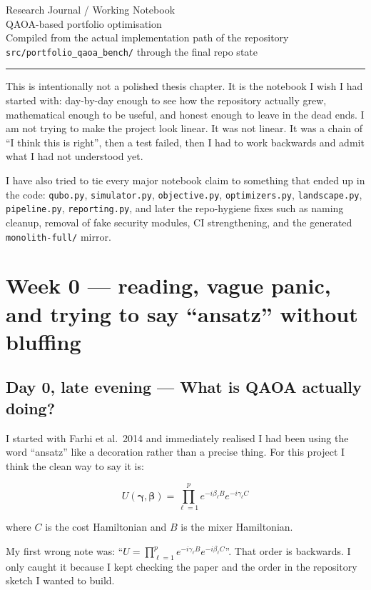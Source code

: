 \documentclass[11pt]{article}
\newcommand{\entry}[2]{\subsection*{#1 --- #2}}
\newcommand{\repo}[1]{\texttt{#1}}
\begin{document}
\begin{center}
{\LARGE Research Journal / Working Notebook}\\[0.4em]
{\large QAOA-based portfolio optimisation}\\[0.6em]
{\normalsize Compiled from the actual implementation path of the repository}\\
{\normalsize \repo{src/portfolio\_qaoa\_bench/} through the final repo state}
\end{center}

\hrule
\vspace{0.8em}

This is intentionally not a polished thesis chapter. It is the notebook I wish I had started with:
day-by-day enough to see how the repository actually grew, mathematical enough to be useful,
and honest enough to leave in the dead ends. I am not trying to make the project look linear.
It was not linear. It was a chain of ``I think this is right'', then a test failed, then I had
to work backwards and admit what I had not understood yet.

I have also tried to tie every major notebook claim to something that ended up in the code:
\repo{qubo.py}, \repo{simulator.py}, \repo{objective.py}, \repo{optimizers.py},
\repo{landscape.py}, \repo{pipeline.py}, \repo{reporting.py}, and later the repo-hygiene fixes
such as naming cleanup, removal of fake security modules, CI strengthening, and the generated
\repo{monolith-full/} mirror.

\section*{Week 0 --- reading, vague panic, and trying to say ``ansatz'' without bluffing}

\entry{Day 0, late evening}{What is QAOA actually doing?}

I started with Farhi et al.\ 2014 and immediately realised I had been using the word
``ansatz'' like a decoration rather than a precise thing. For this project I think the clean
way to say it is:

\[
U(\boldsymbol{\gamma},\boldsymbol{\beta})
= \prod_{\ell=1}^{p} e^{-i\beta_\ell B} e^{-i\gamma_\ell C}
\]

where \(C\) is the cost Hamiltonian and \(B\) is the mixer Hamiltonian.

My first wrong note was: ``\(U = \prod_{\ell=1}^{p} e^{-i\gamma_\ell B} e^{-i\beta_\ell C}\)''.
That order is backwards. I only caught it because I kept checking the paper and the order in the
repository sketch I wanted to build.
\end{document}

